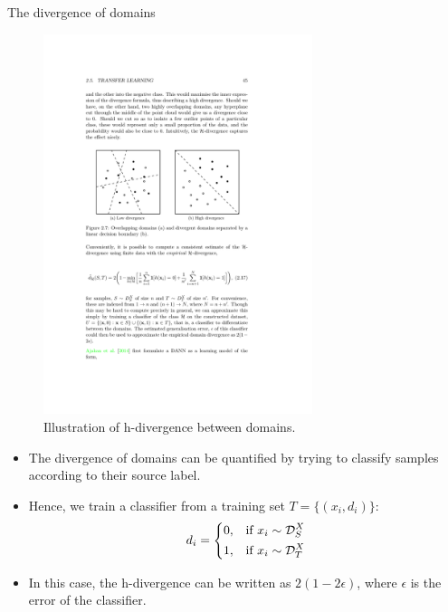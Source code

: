 \documentclass[xcolor=pdftex,dvipsnames,table]{beamer}
\begin{document}
\begin{frame}{The divergence of domains}
\begin{figure}[htb]
   \centering
   \includegraphics[width=0.7\textwidth]{../graphics/h_divergence.pdf}
   \caption{Illustration of h-divergence between domains.}
\end{figure}
\begin{itemize}
\item The divergence of domains can be quantified by trying to classify samples according to their source label. 
\item Hence, we train a classifier from a training set $T=\{(x_i, d_i)\}$: 
\begin{equation}
d_i= 
\begin{dcases}
    0,& \text{if } x_i \sim \mathcal{D}^X_S\\
    1,& \text{if } x_i \sim \mathcal{D}^X_T\\
\end{dcases}
\end{equation}
\item In this case, the h-divergence can be written as $2(1-2 \epsilon)$, where $\epsilon$ is the error of the classifier. 
\end{itemize}
\end{frame}
\end{document}

